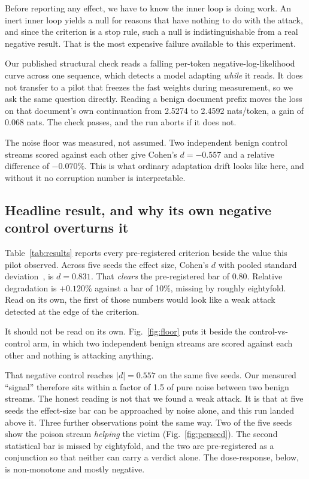 \documentclass[journal]{IEEEtran}
\begin{document}
Before reporting any effect, we have to know the inner loop is doing work. An
inert inner loop yields a null for reasons that have nothing to do with the
attack, and since the criterion is a stop rule, such a null is indistinguishable
from a real negative result. That is the most expensive failure available to this
experiment.

Our published structural check reads a falling per-token negative-log-likelihood
curve across one sequence, which detects a model adapting \emph{while} it reads.
It does not transfer to a pilot that freezes the fast weights during measurement,
so we ask the same question directly. Reading a benign document prefix moves the
loss on that document's own continuation from 2.5274 to 2.4592 nats/token, a gain
of 0.068 nats. The check passes, and the run aborts if it does not.

The noise floor was measured, not assumed. Two independent benign control streams
scored against each other give Cohen's $d = -0.557$ and a relative difference of
$-0.070\%$. This is what ordinary adaptation drift looks like here, and without it
no corruption number is interpretable.

\subsection{Headline result, and why its own negative control overturns it}




Table~\ref{tab:results} reports every pre-registered criterion beside the value
this pilot observed. Across five seeds the effect size, Cohen's $d$ with pooled
standard deviation~\cite{cohen1988}, is $d = 0.831$. That \emph{clears} the
pre-registered bar of 0.80. Relative degradation is $+0.120\%$ against a bar of
10\%, missing by roughly eightyfold. Read on its own, the first of those numbers
would look like a weak attack detected at the edge of the criterion.

It should not be read on its own. Fig.~\ref{fig:floor} puts it beside the
control-vs-control arm, in which two independent benign streams are scored
against each other and nothing is attacking anything.



That negative control reaches $|d| = 0.557$ on the same five seeds. Our measured
``signal'' therefore sits within a factor of 1.5 of pure noise between two benign
streams. The honest reading is not that we found a weak attack. It is that
at five seeds the effect-size bar can be approached by noise alone, and
this run landed above it. Three further observations point the same way. Two of
the five seeds show the poison stream \emph{helping} the victim
(Fig.~\ref{fig:perseed}). The second statistical bar is missed by eightyfold, and
the two are pre-registered as a conjunction so that neither can carry a verdict
alone. The dose-response, below, is non-monotone and mostly negative.
\end{document}

